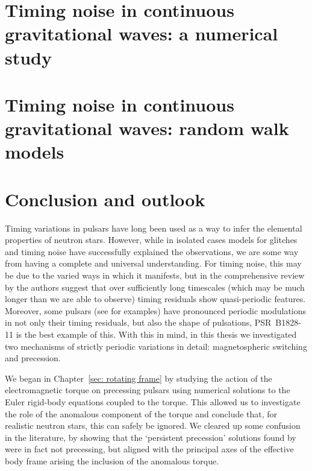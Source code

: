 \documentclass[twoside, 11pt]{thesis}
\begin{document}
\chapter{Timing noise in continuous gravitational waves: a numerical study}
\label{sec: timing noise in cgw}


\chapter{Timing noise in continuous gravitational waves: random walk models}
\label{sec: timing noise in cgw analytic}


\chapter{Conclusion and outlook}
\label{sec: final conclusion}

Timing variations in pulsars have long been used as a way to infer the
elemental properties of neutron stars. However, while in isolated cases models
for glitches and timing noise have successfully explained the observations, we
are some way from having a complete and universal understanding. For timing
noise, this may be due to the varied ways in which it manifests, but in the
comprehensive review by \citet{Hobbs2010} the authors suggest that over
sufficiently long timescales (which may be much longer than we are able to
observe) timing residuals show quasi-periodic features. Moreover, some pulsars
(see \citet{Lyne2010} for examples) have pronounced periodic modulations in not
only their timing residuals, but also the shape of pulsations, PSR~B1828-11 is
the best example of this.  With this in mind, in this thesis we investigated
two mechanisms of strictly periodic variations in detail: magnetospheric
switching and precession.

We began in Chapter~\ref{sec: rotating frame} by studying the action of the
electromagnetic torque on precessing pulsars using numerical solutions to the
Euler rigid-body equations coupled to the \citet{Deutsch1955} torque. This
allowed us to investigate the role of the anomalous component of the torque and
conclude that, for realistic neutron stars, this can safely be ignored. We
cleared up some confusion in the literature, by showing that the `persistent
precession' solutions found by \citet{Melatos2000} were in fact not
precessing, but aligned with the principal axes of the effective body frame
arising the inclusion of the anomalous torque.
\end{document}
